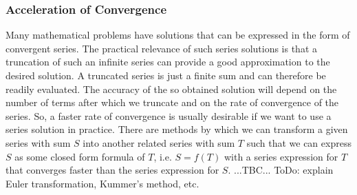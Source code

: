 \subsubsection{Acceleration of Convergence} Many mathematical problems have solutions that can be expressed in the form of convergent series. The practical relevance of such series solutions is that a truncation of such an infinite series can provide a good approximation to the desired solution. A truncated series is just a finite sum and can therefore be readily evaluated. The accuracy of the so obtained solution will depend on the number of terms after which we truncate and on the rate of convergence of the series. So, a faster rate of convergence is usually desirable if we want to use a series solution in practice. There are methods by which we can transform a given series with sum $S$ into another related series with sum $T$ such that we can express $S$ as some closed form formula of $T$, i.e. $S = f(T)$ with a series expression for $T$ that converges faster than the series expression for $S$. ...TBC... ToDo: explain Euler transformation, Kummer's method, etc.






